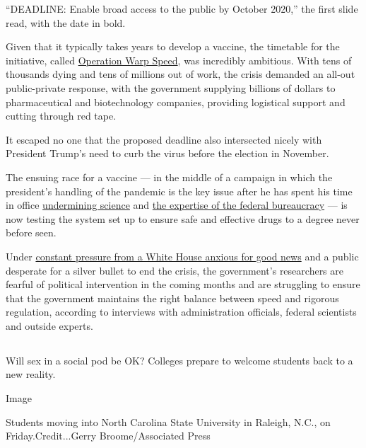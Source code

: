 ``DEADLINE: Enable broad access to the public by October 2020,'' the
first slide read, with the date in bold.

Given that it typically takes years to develop a vaccine, the timetable
for the initiative, called
\href{https://www.nytimes3xbfgragh.onion/2020/04/29/us/politics/trump-coronavirus-vaccine-operation-warp-speed.html}{Operation
Warp Speed}, was incredibly ambitious. With tens of thousands dying and
tens of millions out of work, the crisis demanded an all-out
public-private response, with the government supplying billions of
dollars to pharmaceutical and biotechnology companies, providing
logistical support and cutting through red tape.

It escaped no one that the proposed deadline also intersected nicely
with President Trump's need to curb the virus before the election in
November.

The ensuing race for a vaccine --- in the middle of a campaign in which
the president's handling of the pandemic is the key issue after he has
spent his time in office
\href{https://www.nytimes3xbfgragh.onion/2020/04/28/climate/trump-coronavirus-climate-science.html}{undermining
science} and
\href{https://www.nytimes3xbfgragh.onion/2020/07/09/climate/trump-hurricane-dorian-noaa.html}{the
expertise of the federal bureaucracy} --- is now testing the system set
up to ensure safe and effective drugs to a degree never before seen.

Under
\href{https://www.nytimes3xbfgragh.onion/2020/08/02/us/politics/coronavirus-vaccine.html}{constant
pressure from a White House anxious for good news} and a public
desperate for a silver bullet to end the crisis, the government's
researchers are fearful of political intervention in the coming months
and are struggling to ensure that the government maintains the right
balance between speed and rigorous regulation, according to interviews
with administration officials, federal scientists and outside experts.

\hypertarget{-2}{%
\subsection{}\label{-2}}

Will sex in a social pod be OK? Colleges prepare to welcome students
back to a new reality.

Image

Students moving into North Carolina State University in Raleigh, N.C.,
on Friday.Credit...Gerry Broome/Associated Press

